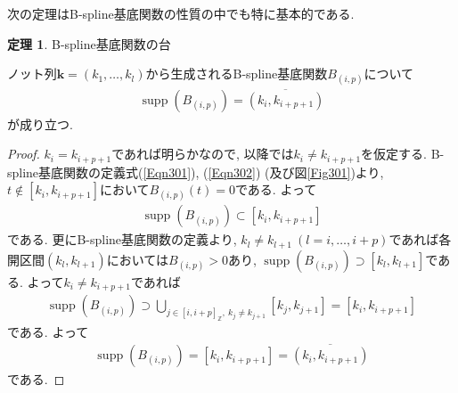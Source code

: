 \documentclass{jsarticle}
\newcommand\Cl[1]{\overline{#1}}
\newcommand\squa[1]{[#1]}
\newcommand\Z[2]{\squa{#1,#2}_\mathbb{Z}}
\DeclareMathOperator{\supp}{supp}
\theoremstyle{definition}%
\newtheorem{thm}{定理}
\begin{document}
\newpage
次の定理はB-spline基底関数の性質の中でも特に基本的である.
\begin{screen}
	\begin{thm}
		\label{Thm301}
		B-spline基底関数の台

		ノット列$\bm{k}=(k_1,\dots,k_l)$から生成されるB-spline基底関数$B_{(i,p)}$について
		\begin{align}
			\supp(B_{(i,p)})=\Cl{(k_{i}, k_{i+p+1})}
		\end{align}
		が成り立つ.
	\end{thm}
\end{screen}
\begin{proof}
    $k_{i}=k_{i+p+1}$であれば明らかなので, 以降では$k_{i}\neq k_{i+p+1}$を仮定する.
	B-spline基底関数の定義式(\ref{Eqn301}), (\ref{Eqn302}) (及び図\ref{Fig301})より, $t\not\in[k_{i}, k_{i+p+1}]$において$B_{(i,p)}(t)=0$である.
	よって
	\begin{align}
		\supp(B_{(i,p)})\subset[k_{i}, k_{i+p+1}]
	\end{align}
	である.
	更にB-spline基底関数の定義より, $k_l\neq k_{l+1} \ (l=i,\dots,i+p)$であれば各開区間$(k_{l}, k_{l+1})$においては$B_{(i,p)}> 0$あり, $\supp(B_{(i,p)})\supset[k_l, k_{l+1}]$である.
	よって$k_{i}\neq k_{i+p+1}$であれば
	\begin{align}
		\supp(B_{(i,p)})
        \supset\bigcup_{j\in \Z{i}{i+p}, \ k_{j}\neq k_{j+1}}[k_{j}, k_{j+1}]=[k_{i}, k_{i+p+1}]
	\end{align}
	である.
	よって
	\begin{align}
		\supp(B_{(i,p)})=[k_{i}, k_{i+p+1}]=\Cl{(k_{i}, k_{i+p+1})}
	\end{align}
	である.
\end{proof}
\end{document}
